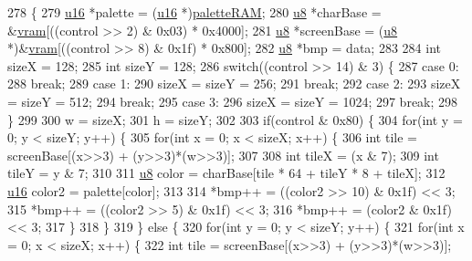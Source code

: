 \begin{DoxyCode}
278 \{
279   \mbox{\hyperlink{_system_8h_a9e6c91d77e24643b888dbd1a1a590054}{u16}} *palette = (\mbox{\hyperlink{_system_8h_a9e6c91d77e24643b888dbd1a1a590054}{u16}} *)\mbox{\hyperlink{_globals_8cpp_aea0283719ad27328f3cf5f883f58813e}{paletteRAM}};
280   \mbox{\hyperlink{_system_8h_aed742c436da53c1080638ce6ef7d13de}{u8}} *charBase = &\mbox{\hyperlink{_globals_8cpp_a983f8cd19ae66ea98e180c2e13bee5b9}{vram}}[((control >> 2) & 0x03) * 0x4000];
281   \mbox{\hyperlink{_system_8h_aed742c436da53c1080638ce6ef7d13de}{u8}} *screenBase = (\mbox{\hyperlink{_system_8h_aed742c436da53c1080638ce6ef7d13de}{u8}} *)&\mbox{\hyperlink{_globals_8cpp_a983f8cd19ae66ea98e180c2e13bee5b9}{vram}}[((control >> 8) & 0x1f) * 0x800];
282   \mbox{\hyperlink{_system_8h_aed742c436da53c1080638ce6ef7d13de}{u8}} *bmp = data;
283 
284   \textcolor{keywordtype}{int} sizeX = 128;
285   \textcolor{keywordtype}{int} sizeY = 128;
286   \textcolor{keywordflow}{switch}((control >> 14) & 3) \{
287   \textcolor{keywordflow}{case} 0:
288     \textcolor{keywordflow}{break};
289   \textcolor{keywordflow}{case} 1:
290     sizeX = sizeY = 256;
291     \textcolor{keywordflow}{break};
292   \textcolor{keywordflow}{case} 2:
293     sizeX = sizeY = 512;
294     \textcolor{keywordflow}{break};
295   \textcolor{keywordflow}{case} 3:
296     sizeX = sizeY = 1024;
297     \textcolor{keywordflow}{break};
298   \}
299 
300   w = sizeX;
301   h = sizeY;
302   
303   \textcolor{keywordflow}{if}(control & 0x80) \{
304     \textcolor{keywordflow}{for}(\textcolor{keywordtype}{int} y = 0; y < sizeY; y++) \{
305       \textcolor{keywordflow}{for}(\textcolor{keywordtype}{int} x = 0; x < sizeX; x++) \{
306         \textcolor{keywordtype}{int} tile = screenBase[(x>>3) + (y>>3)*(w>>3)];
307         
308         \textcolor{keywordtype}{int} tileX = (x & 7);
309         \textcolor{keywordtype}{int} tileY = y & 7;
310         
311         \mbox{\hyperlink{_system_8h_aed742c436da53c1080638ce6ef7d13de}{u8}} color = charBase[tile * 64 + tileY * 8 + tileX];
312         \mbox{\hyperlink{_system_8h_a9e6c91d77e24643b888dbd1a1a590054}{u16}} color2 = palette[color];
313 
314         *bmp++ = ((color2 >> 10) & 0x1f) << 3;
315         *bmp++ = ((color2 >> 5) & 0x1f) << 3;
316         *bmp++ = (color2 & 0x1f) << 3;
317       \}
318     \}
319   \} \textcolor{keywordflow}{else} \{
320     \textcolor{keywordflow}{for}(\textcolor{keywordtype}{int} y = 0; y < sizeY; y++) \{
321       \textcolor{keywordflow}{for}(\textcolor{keywordtype}{int} x = 0; x < sizeX; x++) \{
322         \textcolor{keywordtype}{int} tile = screenBase[(x>>3) + (y>>3)*(w>>3)];

\end{DoxyCode}
